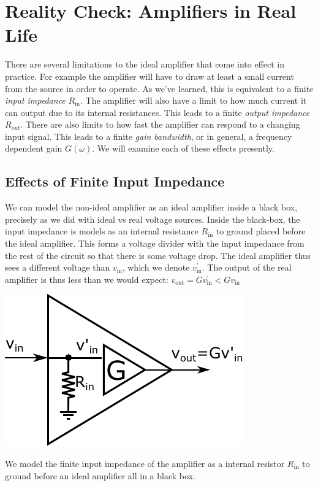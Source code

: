 \documentclass{tufte-book}
\begin{document}
\section{Reality Check: Amplifiers in Real Life}
There are several limitations to the ideal amplifier that come into effect in practice. For example the amplifier will have to draw at least a small current from the source in order to operate. As we've learned, this is equivalent to a finite \textit{input impedance} $R_\text{in}$. The amplifier will also have a limit to how much current it can output due to its internal resistances. This leads to a finite \textit{output impedance} $R_{out}$. There are also limits to how fast the amplifier can respond to a changing input signal. This leads to a finite \textit{gain bandwidth}, or in general, a frequency dependent gain $G(\omega)$. We will examine each of these effects presently.

\subsection{Effects of Finite Input Impedance}
\label{sec:AMP_effect_input}
We can model the non-ideal amplifier as an ideal amplifier inside a black box, precisely as we did with ideal vs real voltage sources. Inside the black-box, the input impedance is models as an internal resistance $R_\text{in}$ to ground placed before the ideal amplifier. This forms a voltage divider with the input impedance from the rest of the circuit so that there is some voltage drop. The ideal amplifier thus sees a different voltage than $v_\text{in}$, which we denote $v^\prime_\text{in}$. The output of the real amplifier is thus less than we would expect: $v_\text{out} = Gv^\prime_\text{in} < Gv_\text{in}$

\begin{marginfigure}%
  \includegraphics[width=\linewidth]{RealAmplifier_int}
  \caption{We model the finite input impedance of the amplifier as a internal resistor $R_\text{in}$ to ground before an ideal amplifier all in a black box.}
  \label{fig:real_amp_int}
\end{marginfigure}
\end{document}

